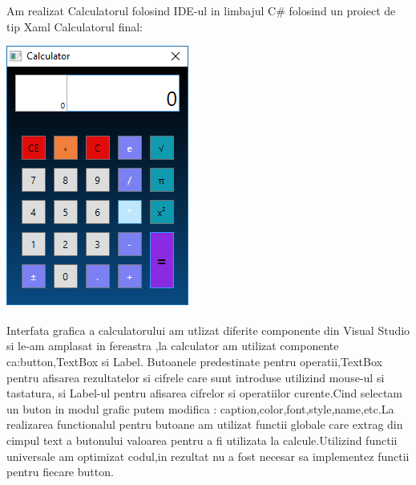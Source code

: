 Am realizat Calculatorul folosind IDE-ul in limbajul \textsc{\large C\#} folosind un proiect de tip Xaml Calculatorul final:\\
\begin{center}
\includegraphics[scale=1]{images/1}
\end{center}
Interfata grafica a calculatorului am utlizat diferite componente din Visual Studio si le-am amplasat in fereastra ,la calculator am utilizat componente ca:button,TextBox si Label.
Butoanele predestinate pentru operatii,TextBox pentru afisarea rezultatelor si cifrele care sunt introduse utilizind mouse-ul si tastatura, si Label-ul pentru afisarea cifrelor si operatiilor curente.Cind selectam un buton in modul grafic putem modifica : caption,color,font,style,name,etc.La realizarea functionalul pentru butoane am utilizat functii globale care extrag din cimpul text a butonului valoarea pentru a fi utilizata la calcule.Utilizind functii universale am optimizat codul,in rezultat nu a fost necesar sa implementez functii pentru fiecare button.

